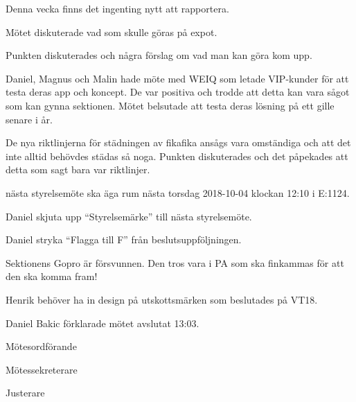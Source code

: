 \documentclass[10pt]{article}
\def\mo{Daniel Bakic}
\def\ms{Magnus Lundh}
\def\ji{Isabella Hansen}
\begin{document}
\begin{paragrafer}
\begin{paragrafer}

		Denna vecka finns det ingenting nytt att rapportera.

	\end{paragrafer}

	Mötet diskuterade vad som skulle göras på expot.


	Punkten diskuterades och några förslag om vad man kan göra kom upp.

	Daniel, Magnus och Malin hade möte med WEIQ som letade VIP-kunder för att testa deras app och koncept.
	De var positiva och trodde att detta kan vara sågot som kan gynna sektionen.
	Mötet belsutade att testa deras lösning på ett gille senare i år.

	De nya riktlinjerna för städningen av fikafika ansågs vara omständiga och att det inte alltid behövdes städas så noga.
	Punkten diskuterades och det påpekades att detta som sagt bara var riktlinjer.


	\Mba nästa styrelsemöte ska äga rum nästa torsdag 2018-10-04 klockan 12:10 i E:1124.


	Daniel \ypa skjuta upp ``Styrelsemärke'' till nästa styrelsemöte.

	\Mbaby

	Daniel \ypa stryka ``Flagga till F'' från beslutsuppföljningen.

	\Mbaby



	Sektionens Gopro är försvunnen. Den tros vara i PA som ska finkammas för att den ska komma fram!

	Henrik behöver ha in design på utskottsmärken som beslutades på VT18.

	{\mo} förklarade mötet avslutat 13:03.
\end{paragrafer}

\hidesignfoot
\begin{signatures}{3}
	\signature{\mo}{Mötesordförande}
	\signature{\ms}{Mötessekreterare}
	\signature{\ji}{Justerare}
\end{signatures}
\end{document}
